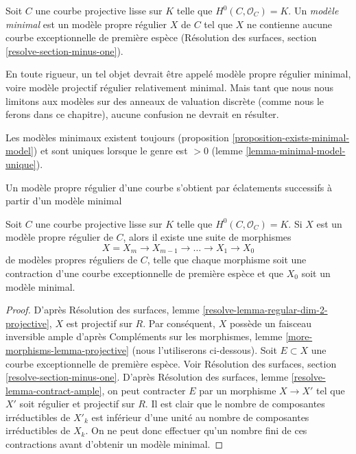 \begin{definition}
\label{definition-minimal-model}
Soit $C$ une courbe projective lisse sur $K$ telle que
$H^0(C, \mathcal{O}_C) = K$. Un {\it modèle minimal}
est un modèle propre régulier $X$ de $C$ tel que
$X$ ne contienne aucune courbe exceptionnelle de première espèce
(Résolution des surfaces, section \ref{resolve-section-minus-one}).
\end{definition}

\noindent
En toute rigueur, un tel objet devrait être appelé modèle propre régulier minimal,
voire modèle projectif régulier relativement minimal. Mais tant que
nous nous limitons aux modèles sur des anneaux de valuation discrète (comme nous le ferons
dans ce chapitre), aucune confusion ne devrait en résulter.

\medskip\noindent
Les modèles minimaux existent toujours
(proposition \ref{proposition-exists-minimal-model}) et sont uniques
lorsque le genre est $> 0$ (lemme \ref{lemma-minimal-model-unique}).

\begin{lemma}
\label{lemma-pre-exists-minimal-model}
\begin{slogan}
Un modèle propre régulier d'une courbe s'obtient par éclatements successifs
à partir d'un modèle minimal
\end{slogan}
Soit $C$ une courbe projective lisse sur $K$ telle que
$H^0(C, \mathcal{O}_C) = K$. Si $X$ est un modèle propre régulier
de $C$, alors il existe une suite de morphismes
$$
X = X_m \to X_{m - 1} \to \ldots \to X_1 \to X_0
$$
de modèles propres réguliers de $C$, telle que chaque morphisme soit une
contraction d'une courbe exceptionnelle de première espèce et que
$X_0$ soit un modèle minimal.
\end{lemma}

\begin{proof}
D'après Résolution des surfaces, lemme \ref{resolve-lemma-regular-dim-2-projective},
$X$ est projectif sur $R$. Par conséquent, $X$ possède un faisceau inversible
ample d'après
Compléments sur les morphismes, lemme \ref{more-morphisms-lemma-projective}
(nous l'utiliserons ci-dessous).
Soit $E \subset X$ une courbe exceptionnelle de première espèce.
Voir Résolution des surfaces, section \ref{resolve-section-minus-one}.
D'après Résolution des surfaces, lemme \ref{resolve-lemma-contract-ample},
on peut contracter $E$ par un morphisme $X \to X'$ tel que $X'$ soit
régulier et projectif sur $R$. Il est clair que le nombre de
composantes irréductibles de $X'_k$ est inférieur d'une unité au
nombre de composantes irréductibles de $X_k$. On ne peut donc
effectuer qu'un nombre fini de ces contractions avant
d'obtenir un modèle minimal.
\end{proof}

